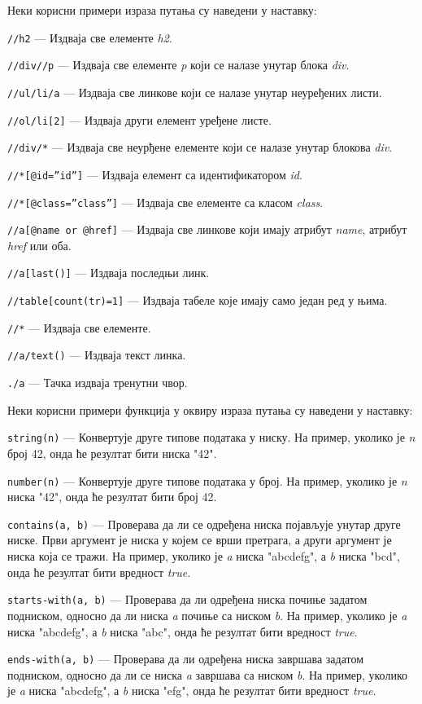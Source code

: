 \documentclass[12pt,oneside]{memoir}
\begin{document}
Неки корисни примери израза путања су наведени у наставку:
\begin{description}
\item \texttt{//h2} --- Издваја све елементе \textit{h2}.
\item \texttt{//div//p} --- Издваја све елементе \textit{p} који се налазе унутар блока \textit{div}.
\item \texttt{//ul/li/a} --- Издваја све линкове који се налазе унутар неуређених листи.
\item \texttt{//ol/li[2]} --- Издваја други елемент уређене листе.
\item \texttt{//div/*} --- Издваја све неурђене елементе који се налазе унутар блокова \textit{div}.
\item \texttt{//*[@id=''id'']} --- Издваја елемент са идентификатором \textit{id}.
\item \texttt{//*[@class=''class'']} --- Издваја све елементе са класом \textit{class}.
\item \texttt{//a[@name or @href]} --- Издваја све линкове који имају атрибут \textit{name}, атрибут \textit{href} или оба.
\item \texttt{//a[last()]} --- Издваја последњи линк.
\item \texttt{//table[count(tr)=1]} --- Издваја табеле које имају само један ред у њима.
\item \texttt{//*} --- Издваја све елементе.
\item \texttt{//a/text()} --- Издваја текст линка.
\item \texttt{./a} --- Тачка издваја тренутни чвор.
\end{description}

Неки корисни примери функција у оквиру израза путања су наведени у наставку:
\begin{description}
\item \texttt{string(n)} --- Конвертује друге типове података у ниску. На пример, уколико је \textit{n} број 42, онда ће резултат бити ниска "42".
\item \texttt{number(n)} --- Конвертује друге типове података у број. На пример, уколико је \textit{n} ниска "42", онда ће резултат бити број 42.
\item \texttt{contains(a, b)} --- Проверава да ли се одређена ниска појављује унутар друге ниске. Први аргумент је ниска у којем се врши претрага, а други аргумент је ниска која се тражи. На пример, уколико је \textit{a} ниска "abcdefg", а \textit{b} ниска "bcd", онда ће резултат бити вредност \textit{true}.
\item \texttt{starts-with(a, b)} --- Проверава да ли одређена ниска почиње задатом подниском, односно да ли ниска \textit{a} почиње са ниском \textit{b}.
На пример, уколико је \textit{a} ниска "abcdefg", а \textit{b} ниска "abc", онда ће резултат бити вредност \textit{true}.
\item \texttt{ends-with(a, b)} --- Проверава да ли одређена ниска завршава задатом подниском, односно да ли се ниска \textit{a} завршава са ниском \textit{b}.
На пример, уколико је \textit{a} ниска "abcdefg", а \textit{b} ниска "efg", онда ће резултат бити вредност \textit{true}.
\end{description}
\end{document}
